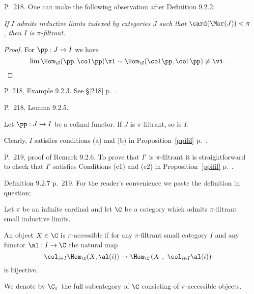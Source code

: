 \documentclass[12pt]{article}
\theoremstyle{remark}
\theoremstyle{definition}
\begin{document}
%

\begin{s}
P.~218. One can make the following observation after Definition 9.2.2: 

\emph{If $I$ admits inductive limits indexed by categories $J$ such that $\card(\Mor(J))<\pi$, then $I$ is $\pi$-filtrant.} 

\begin{proof}
For $\pp:J\to I$ we have
$$
\lim\Hom_\C(\pp,\col\pp)\xl\sim\Hom_\C(\col\pp,\col\pp)\neq\vi.
$$
\end{proof}
\end{s}

%

\begin{s}
P. 218, Example 9.2.3. See \S\ref{218} p.~.%
\end{s}

%

\begin{s}
P.~218, Lemma 9.2.5. 

\begin{lem}[Lemma 9.2.5 p.~218] 
Let $\pp:J\to I$ be a cofinal functor. If $J$ is $\pi$-filtrant, so is $I$.
\end{lem}

Clearly, $I$ satisfies conditions (a) and (b) in Proposition~\ref{ppifil} p.~. 
\end{s}

%

\begin{s}
P.~219, proof of Remark 9.2.6. To prove that $I'$ is $\pi$-filtrant it is straightforward to check that $I'$ satisfies Conditions (c1) and (c2) in Proposition~\ref{ppifil} p.~.
\end{s}

%

\begin{s}
Definition 9.2.7 p.~219. For the reader's convenience we paste the definition in question:
\begin{df}
Let $\pi$ be an infinite cardinal and let $\C$ be a category which admits $\pi$-filtrant small inductive limits.

An object $X\in\C$ is $\pi$-accessible if for any $\pi$-filtrant small category $I$ and any functor $\al:I\to\C$ the natural map
$$
\col_{i\in I}\Hom_\C(X,\al(i))\to \Hom_\C\left(X\ ,\ \col_{i\in I}\al(i)\right)
$$
is bijective.

We denote by $\C_\pi$ the full subcategory of $\C$ consisting of $\pi$-accessible objects.
\end{df}
\end{s}
\end{document}
